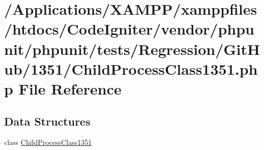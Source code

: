 \hypertarget{_child_process_class1351_8php}{}\section{/\+Applications/\+X\+A\+M\+P\+P/xamppfiles/htdocs/\+Code\+Igniter/vendor/phpunit/phpunit/tests/\+Regression/\+Git\+Hub/1351/\+Child\+Process\+Class1351.php File Reference}
\label{_child_process_class1351_8php}
\subsection*{Data Structures}
\begin{DoxyCompactItemize}
\item 
class \mbox{\hyperlink{class_child_process_class1351}{Child\+Process\+Class1351}}
\end{DoxyCompactItemize}
